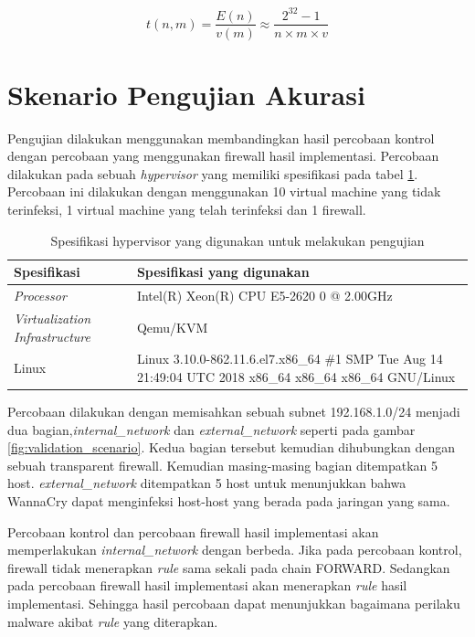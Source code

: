 \begin{equation}
\label{eqn:expected_time}
t(n,m) = \frac{E(n)}{v(m)} \approx \frac{2^{32}-1}{n \times m \times v}
\end{equation}

\section{Skenario Pengujian Akurasi}

Pengujian dilakukan menggunakan membandingkan hasil percobaan kontrol dengan percobaan yang menggunakan firewall hasil implementasi. Percobaan dilakukan pada sebuah \textit{hypervisor} yang memiliki spesifikasi pada tabel \ref{table:hypervisor_specification}. Percobaan ini dilakukan dengan menggunakan 10 virtual machine yang tidak terinfeksi, 1 virtual machine yang telah terinfeksi dan 1 firewall.

\begin{table}[H]
	\caption{Spesifikasi hypervisor yang digunakan untuk melakukan pengujian}
	\label{table:hypervisor_specification}
	\begin{tabularx}{\textwidth}{|l|X|}
		\hline
		\textbf{Spesifikasi} & \textbf{Spesifikasi yang digunakan} \\ \hline
		\textit{Processor} & Intel(R) Xeon(R) CPU E5-2620 0 @ 2.00GHz \\ \hline 
		\textit{Virtualization Infrastructure} & Qemu/KVM \\ \hline
		Linux & Linux 3.10.0-862.11.6.el7.x86\_64 \#1 SMP Tue Aug 14 21:49:04 UTC 2018 x86\_64 x86\_64 x86\_64 GNU/Linux \\ \hline
	\end{tabularx}
\end{table}


Percobaan dilakukan dengan memisahkan sebuah subnet 192.168.1.0/24 menjadi dua bagian,\textit{internal\_network} dan \textit{external\_network} seperti pada gambar \ref{fig:validation_scenario}. Kedua bagian tersebut kemudian dihubungkan dengan sebuah transparent firewall. Kemudian masing-masing bagian ditempatkan 5 host. \textit{external\_network} ditempatkan 5 host untuk menunjukkan bahwa WannaCry dapat menginfeksi host-host yang berada pada jaringan yang sama. 

Percobaan kontrol dan percobaan firewall hasil implementasi akan memperlakukan \textit{internal\_network} dengan berbeda. Jika pada percobaan kontrol, firewall tidak menerapkan \textit{rule} sama sekali pada chain FORWARD. Sedangkan pada percobaan firewall hasil implementasi akan menerapkan \textit{rule} hasil implementasi. Sehingga hasil percobaan dapat menunjukkan bagaimana perilaku malware akibat \textit{rule} yang diterapkan.

